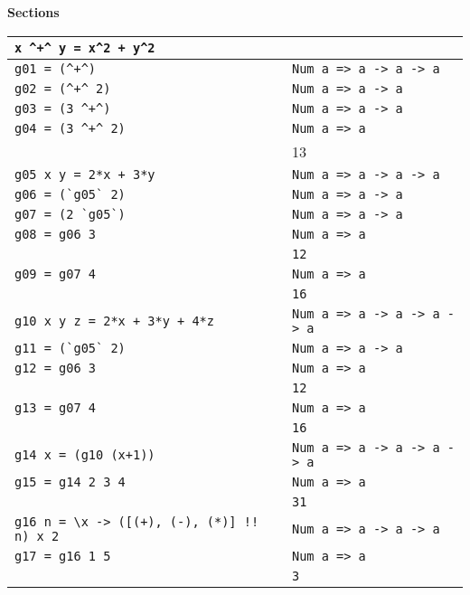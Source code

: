 \textbf{Sections}\\
\begin{tabularx}{\linewidth}{|X|X|}
  \hline
  \lstinline|x ^+^ y = x^2 + y^2| & \\
  \hline
  \lstinline|g01 = (^+^)| & \lstinline|Num a => a -> a -> a|\\
  \hline
  \lstinline|g02 = (^+^ 2)| & \lstinline|Num a => a -> a|\\
  \hline
  \lstinline|g03 = (3 ^+^)| & \lstinline|Num a => a -> a|\\
  \hline
  \lstinline|g04 = (3 ^+^ 2)| & \lstinline|Num a => a|\\
   & 13\\
  \hline
  \lstinline|g05 x y = 2*x + 3*y| & \lstinline|Num a => a -> a -> a| \\
  \hline
  \lstinline|g06 = (`g05` 2)| & \lstinline|Num a => a -> a|\\
  \hline
  \lstinline|g07 = (2 `g05`)| & \lstinline|Num a => a -> a|\\
  \hline
  \lstinline|g08 = g06 3| & \lstinline|Num a => a|\\
   & \lstinline|12|\\
  \hline
  \lstinline|g09 = g07 4| & \lstinline|Num a => a|\\
   & \lstinline|16|\\
  \hline
  \lstinline|g10 x y z = 2*x + 3*y + 4*z| & \lstinline|Num a => a -> a -> a -> a|\\
  \hline
  \lstinline|g11 = (`g05` 2)| & \lstinline|Num a => a -> a|\\
  \hline
  \lstinline|g12 = g06 3| & \lstinline|Num a => a|\\
   & \lstinline|12|\\
  \hline
  \lstinline|g13 = g07 4| & \lstinline|Num a => a|\\
   & \lstinline|16|\\
  \hline
  \lstinline|g14 x = (g10 (x+1))| & \lstinline|Num a => a -> a -> a -> a|\\
  \hline
  \lstinline|g15 = g14 2 3 4| & \lstinline|Num a => a|\\
   & \lstinline|31|\\
  \hline
  \lstinline|g16 n = \x -> ([(+), (-), (*)] !! n) x 2| & \lstinline|Num a => a -> a -> a|\\
  \hline
  \lstinline|g17 = g16 1 5| & \lstinline|Num a => a|\\
   & \lstinline|3|\\
  \hline
\end{tabularx}

